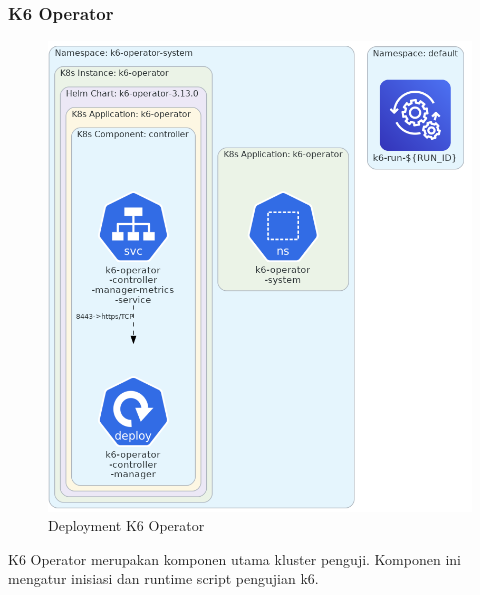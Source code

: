 \pagebreak

\subsubsection{K6 Operator}

\begin{figure}[htbp]
    \centering
    \includegraphics[width=1\textwidth]{resources/chapter-4/k6-operator.png}
    \caption{Deployment K6 Operator}
    \label{fig:deployment-k6-operator}
\end{figure}

K6 Operator merupakan komponen utama kluster penguji. Komponen ini mengatur inisiasi dan runtime script pengujian k6.

\pagebreak